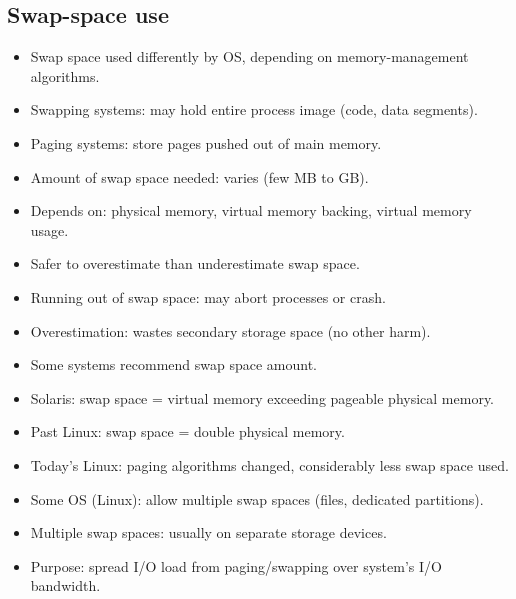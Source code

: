 \subsection{Swap-space use}
\begin{itemize}
    \item Swap space used differently by OS, depending on memory-management algorithms.
    \item Swapping systems: may hold entire process image (code, data segments).
    \item Paging systems: store pages pushed out of main memory.
    \item Amount of swap space needed: varies (few MB to GB).
    \item Depends on: physical memory, virtual memory backing, virtual memory usage.
    \item Safer to overestimate than underestimate swap space.
    \item Running out of swap space: may abort processes or crash.
    \item Overestimation: wastes secondary storage space (no other harm).
    \item Some systems recommend swap space amount.
    \item Solaris: swap space = virtual memory exceeding pageable physical memory.
    \item Past Linux: swap space = double physical memory.
    \item Today's Linux: paging algorithms changed, considerably less swap space used.
    \item Some OS (Linux): allow multiple swap spaces (files, dedicated partitions).
    \item Multiple swap spaces: usually on separate storage devices.
    \item Purpose: spread I/O load from paging/swapping over system's I/O bandwidth.
\end{itemize}

